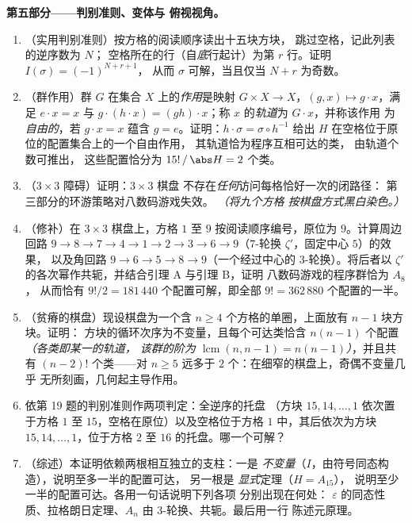 \begin{problem}
\medskip
\noindent\textbf{第五部分——判别准则、变体与
俯视视角。}
\begin{enumerate}[resume]
  \item （实用判别准则）按方格的阅读顺序读出十五块方块，
        跳过空格，记此列表的逆序数为 $N$；
        空格所在的行（自\emph{底}行起计）为第 $r$ 行。证明
        $I(\sigma) = (-1)^{N + r + 1}$，
        从而 $\sigma$ 可解，当且仅当
        $N + r$ 为奇数。
  \item （群作用）群 $G$ 在集合
        $X$ 上的\emph{作用}是映射 $G \times X \to X$，$(g, x) \mapsto g \cdot
        x$，满足 $e \cdot x = x$ 与 $g \cdot (h \cdot x) =
        (gh) \cdot x$；称 $x$ 的\emph{轨道}为 $G \cdot x$，并称该作用
        为\emph{自由的}，若 $g \cdot x = x$ 蕴含 $g =
        e$。证明：$h \cdot \sigma = \sigma \circ h^{-1}$
        给出 $H$ 在空格位于原位的配置集合上的一个自由作用，
        其轨道恰为程序互相可达的类，
        由轨道个数可推出，
        这些配置恰分为
        $15!\,/\,\abs H = 2$ 个类。
  \item （$3 \times 3$ 障碍）证明：$3 \times 3$ 棋盘
        不存在\emph{任何}访问每格恰好一次的闭路径：
        第三部分的环游策略对八数码游戏失效。
        \emph{（将九个方格
        按棋盘方式黑白染色。）}
  \item （修补）在 $3 \times 3$ 棋盘上，方格 $1$ 至
        $9$ 按阅读顺序编号，原位为 $9$。计算周边回路
        $9 \to 8 \to 7 \to 4 \to 1 \to 2 \to 3
        \to 6 \to 9$（$7$-轮换 $\zeta'$，固定中心 $5$）的效果，
        以及角回路 $9 \to 6 \to 5 \to 8 \to 9$（一个经过中心的
        $3$-轮换）。将后者以
        $\zeta'$ 的各次幂作共轭，并结合引理 A 与引理 B，证明
        八数码游戏的程序群恰为 $A_8$，
        从而恰有 $9!/2 = 181\,440$ 个配置可解，即全部 $9! =
        362\,880$ 个配置的一半。
  \item （贫瘠的棋盘）现设棋盘为一个含 $n
        \geq 4$ 个方格的单圈，上面放有 $n - 1$ 块方块。证明：
        方块的循环次序为不变量，且每个可达类恰含
        $n(n - 1)$ 个配置\emph{（各类即某一的轨道，
        该群的阶为
        $\operatorname{lcm}(n, n-1) = n(n-1)$）}，并且共有
        $(n - 2)!$ 个类——对 $n \geq 5$ 远多于
        $2$ 个：在细窄的棋盘上，奇偶不变量几乎
        无所刻画，几何起主导作用。
  \item 依第 19 题的判别准则作两项判定：全逆序的托盘
        （方块 $15, 14, \dots, 1$ 依次置于方格 $1$ 至
        $15$，空格在原位）以及空格位于方格
        $1$ 中，其后依次为方块 $15, 14, \dots, 1$，位于方格 $2$
        至 $16$ 的托盘。哪一个可解？
  \item （综述）本证明依赖两根相互独立的支柱：一是
        \emph{不变量}（$I$，由符号同态构造），说明至多一半的配置可达，
        另一根是
        \emph{显式}定理（$H = A_{15}$），
        说明至少一半的配置可达。各用一句话说明下列各项
        分别出现在何处：
        $\varepsilon$ 的同态性质、拉格朗日定理、$A_n$ 由
        $3$-轮换、共轭。最后用一行
        陈述元原理。
\end{enumerate}
\end{problem}
